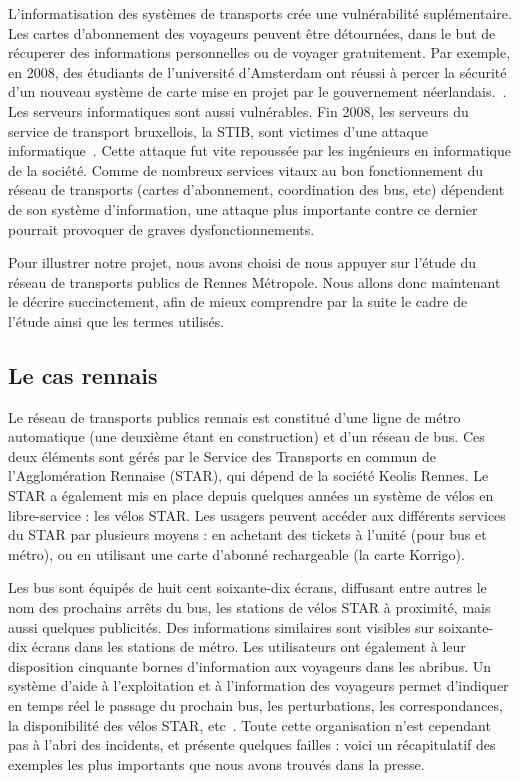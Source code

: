     	L'informatisation des systèmes de transports crée une vulnérabilité suplémentaire. Les cartes d'abonnement des voyageurs peuvent être détournées, dans le but de récuperer des informations personnelles ou de voyager gratuitement. Par exemple, en 2008, des étudiants de l'université d'Amsterdam ont réussi à percer la sécurité d'un nouveau système de carte mise en projet par le gouvernement néerlandais.~\cite{Amst_RFID}. Les serveurs informatiques sont aussi vulnérables. Fin 2008, les serveurs du service de transport bruxellois, la STIB, sont victimes d'une attaque informatique~\cite{STIB}. 
    	Cette attaque fut vite repoussée par les ingénieurs en informatique de la société. Comme de nombreux services vitaux au bon fonctionnement du réseau de transports (cartes d'abonnement, coordination des bus, etc) dépendent de son système d'information, une attaque plus importante contre ce dernier pourrait provoquer de graves dysfonctionnements.

    	Pour illustrer notre projet, nous avons choisi de nous appuyer sur l'étude du réseau de transports publics de Rennes Métropole. Nous allons donc maintenant le décrire succinctement, afin de mieux comprendre par la suite le cadre de l'étude ainsi que les termes utilisés.
                
    \subsection{Le cas rennais}
    	Le réseau de transports publics rennais est constitué d'une ligne de métro automatique (une deuxième étant en construction) et d'un réseau de bus. Ces deux éléments sont gérés par le Service des Transports en commun de l'Agglomération Rennaise (STAR), qui dépend de la société Keolis Rennes. Le STAR a également mis en place depuis quelques années un système de vélos en libre-service : les vélos STAR. Les usagers peuvent accéder aux différents services du STAR par plusieurs moyens : en achetant des tickets à l'unité (pour bus et métro), ou en utilisant une carte d'abonné rechargeable (la carte Korrigo). 

        Les bus sont équipés de huit cent soixante-dix écrans, diffusant entre autres le nom des prochains arrêts du bus, les stations de vélos STAR à proximité, mais aussi quelques publicités. Des informations similaires sont visibles sur soixante-dix écrans dans les stations de métro. Les utilisateurs ont également à leur disposition cinquante bornes d’information aux voyageurs dans les abribus. Un système d’aide à l’exploitation et à l’information des voyageurs permet d’indiquer en temps réel le passage du prochain bus, les perturbations, les correspondances, la disponibilité des vélos STAR, etc~\cite{chiffres_star}. Toute cette organisation n'est cependant pas à l'abri des incidents, et présente quelques failles : voici un récapitulatif des exemples les plus importants que nous avons trouvés dans la presse.
        
